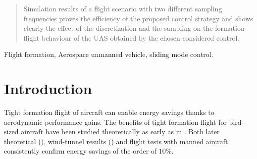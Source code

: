 \documentclass{ifacconf}
\begin{document}
\begin{frontmatter}
\begin{abstract}
Simulation results of a flight scenario with two different sampling frequencies proves the efficiency of the proposed control strategy and shows clearly the effect of the discretization and the sampling  on the formation flight behaviour of the UAS obtained by the chosen considered control.



%
%
\end{abstract}

\begin{keyword}
Flight formation, Aerospace unmanned vehicle, sliding mode control.
\end{keyword}

\end{frontmatter}

\section{Introduction}
Tight formation flight of aircraft can enable energy savings thanks to aerodynamic performance gains.
The benefits of tight formation flight for bird-sized aircraft have been studied theoretically as early as in \cite{Hummel1982}. Both later theoretical (\cite{???}), wind-tunnel results  (\cite{???}) and flight tests with manned aircraft consistently confirm energy savings of the order of $10 \%$.
\end{document}
